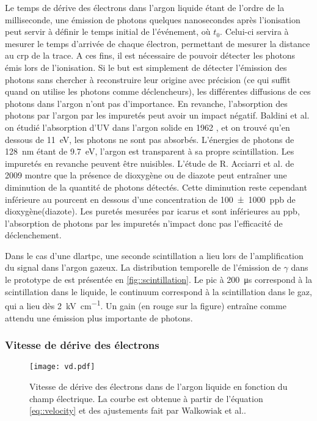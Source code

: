         Le temps de dérive des électrons dans l'argon liquide étant de l'ordre de la milliseconde, une émission de photons quelques nanosecondes après l'ionisation peut servir à définir le temps initial de l'événement, où $t_0$. Celui-ci servira à mesurer le temps d'arrivée de chaque électron, permettant de mesurer la distance au \gls{crp} de la trace. A ces fins, il est nécessaire de pouvoir détecter les photons émis lors de l'ionisation. Si le but est simplement de détecter l'émission des photons sans chercher à reconstruire leur origine avec précision (ce qui suffit quand on utilise les photons comme déclencheurs), les différentes diffusions de ces photons dans l'argon n'ont pas d'importance. En revanche, l'absorption des photons par l'argon par les impuretés peut avoir un impact négatif. Baldini et al. on étudié l'absorption d'UV dans l'argon solide en 1962 \cite{Baldini1962}, et on trouvé qu'en dessous de \SI{11}{\eV}, les photons ne sont pas absorbés. L'énergies de photons de \SI{128}{\nano\meter} étant de \SI{9.7}{\eV}, l'argon est transparent à sa propre scintillation. Les impuretés en revanche peuvent être nuisibles. L'étude de R. Acciarri et al. de 2009\cite{Acciarri2009} montre que la présence de dioxygène ou de diazote peut entraîner une diminution de la quantité de photons détectés. Cette diminution reste cependant inférieure au pourcent en dessous d'une concentration de \SI{100(1000)}{ppb} de dioxygène(diazote). Les puretés mesurées par \gls{icarus}\cite{Antonello2014} et \protosp{} sont inférieures au \si{ppb}, l'absorption de photons par les impuretés n'impact donc pas l'efficacité de déclenchement.

        Dans le cas d'une \gls{dlartpc}, une seconde scintillation a lieu lors de l'amplification du signal dans l'argon gazeux. La distribution temporelle de l'émission de $\gamma$ dans le prototype de \TOO{} est présentée en \autoref{fig::scintillation}. Le pic à \SI{200}{\micro\second} correspond à la scintillation dans le liquide, le continuum correspond à la scintillation dans le gaz, qui a lieu dès \SI{2}{\kilo\volt\per\centi\meter}. Un gain (en rouge sur la figure) entraîne comme attendu une émission plus importante de photons.

      \subsubsection{Vitesse de dérive des électrons}\label{sec::vitesse_derive}

        \begin{figure}[!htb]
          \centering
          \texttt{[image: vd.pdf]}
          \caption[Vitesse de dérive des électrons dans de l'argon liquide en fonction du champ électrique]{\label{fig::velocity}Vitesse de dérive des électrons dans de l'argon liquide en fonction du champ électrique. La courbe est obtenue à partir de l'équation \eqref{eq::velocity} et des ajustements fait par Walkowiak et al.\cite{Walkowiak2000}.}
        \end{figure}

